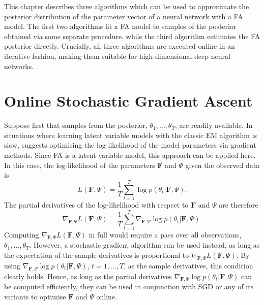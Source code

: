 \documentclass[msc,deptreport.inf]{infthesis} %
\newcommand{\matr}[1]{\mathbf{#1}}
\begin{document}
This chapter describes three algorithms which can be used to approximate the posterior distribution of the parameter vector of a neural network with a FA model. The first two algorithms fit a FA model to samples of the posterior obtained via some separate procedure, while the third algorithm estimates the FA posterior directly. Crucially, all three algorithms are executed online in an iterative fashion, making them suitable for high-dimensional deep neural networks. 

\section{Online Stochastic Gradient Ascent}\label{sec:gradient_fa}

Suppose first that samples from the posterior, $\theta_1,\dots,\theta_T$, are readily available. In situations where learning latent variable models with the classic EM algorithm is slow, \cite{barber2007} suggests optimising the log-likelihood of the model parameters via gradient methods. Since FA is a latent variable model, this approach can be applied here. In this case, the log-likelihood of the parameters $\matr{F}$ and $\Psi$ given the observed data is 
\begin{equation}
	L(\matr{F}, \Psi) = \frac{1}{T} \sum_{t=1}^T \log p(\theta_t | \matr{F}, \Psi).
\end{equation}
The partial derivatives of the log-likelihood with respect to $\matr{F}$ and $\Psi$ are therefore
\begin{equation}
	\nabla_{\matr{F}, \Psi} L(\matr{F}, \Psi) = \frac{1}{T} \sum_{t=1}^T \nabla_{\matr{F}, \Psi} \log p(\theta_t | \matr{F}, \Psi).
\end{equation}
Computing $\nabla_{\matr{F}, \Psi} L(\matr{F}, \Psi)$ in full would require a pass over all observations, $\theta_1, \dots, \theta_T$. However, a stochastic gradient algorithm can be used instead, as long as the expectation of the sample derivatives is proportional to $\nabla_{\matr{F}, \Psi} L(\matr{F}, \Psi)$. By using $\nabla_{\matr{F}, \Psi} \log p(\theta_t | \matr{F}, \Psi)$, $t=1,\dots,T$, as the sample derivatives, this condition clearly holds. Hence, as long as the partial derivatives $\nabla_{\matr{F}, \Psi} \log p(\theta_t | \matr{F}, \Psi)$ can be computed efficiently, they can be used in conjunction with SGD or any of its variants to optimise $\matr{F}$ and $\Psi$ online. 
\end{document}
